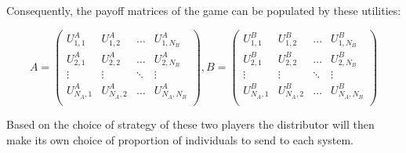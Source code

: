 Consequently, the payoff matrices of the game can be populated by these 
utilities:

\begin{equation} \label{eq:payoff-matrices}
    A = 
    \begin{pmatrix}
        U_{1,1}^A & U_{1,2}^A & \dots & U_{1,N_B}^A \\
        U_{2,1}^A & U_{2,2}^A & \dots & U_{2,N_B}^A \\
        \vdots & \vdots & \ddots & \vdots \\
        U_{N_A,1}^A & U_{N_A,2}^A & \dots & U_{N_A,N_B}^A \\
    \end{pmatrix},
    B = 
    \begin{pmatrix}
        U_{1,1}^B & U_{1,2}^B & \dots & U_{1,N_B}^B \\
        U_{2,1}^B & U_{2,2}^B & \dots & U_{2,N_B}^B \\
        \vdots & \vdots & \ddots & \vdots \\
        U_{N_A,1}^B & U_{N_A,2}^B & \dots & U_{N_A,N_B}^B \\
    \end{pmatrix}
\end{equation}

Based on the choice of strategy of these two players the distributor will then 
make its own choice of proportion of individuals to send to each system.
 